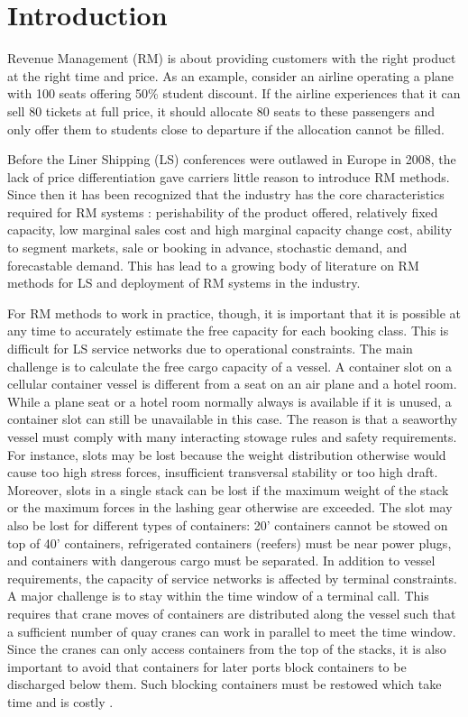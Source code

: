 \section{Introduction}

Revenue Management (RM) is about providing customers with the right product at the right time and price. As an example, consider an airline operating a plane with 100 seats offering 50\% student discount. If the airline experiences that it can sell 80 tickets at full price, it should allocate 80 seats to these passengers and only offer them to students close to departure if the allocation cannot be filled.

Before the Liner Shipping (LS) conferences were outlawed in Europe in 2008, the lack of price differentiation gave carriers little reason to introduce RM methods. Since then it has been recognized that the industry has the core characteristics required for RM systems \cite{Hellerman06}: perishability of the product offered, relatively fixed capacity, low marginal sales cost and high marginal capacity change cost, ability to segment markets, sale or booking in advance, stochastic demand, and forecastable demand. This has lead to a growing body of literature on RM methods for LS and deployment of RM systems in the industry.

For RM methods to work in practice, though, it is important that it is possible at any time to accurately estimate the free capacity for each booking class. This is difficult for LS service networks due to operational constraints. The main challenge is to calculate the free cargo capacity of a vessel. A container slot on a cellular container vessel is different from a seat on an air plane and a hotel room. While a plane seat or a hotel room normally always is available if it is unused, a container slot can still be unavailable in this case. The reason is that a seaworthy vessel must comply with many interacting stowage rules and safety requirements. For instance, slots may be lost because the weight distribution otherwise would cause too high stress forces, insufficient transversal stability or too high draft. Moreover, slots in a single stack can be lost if the maximum weight of the stack or the maximum forces in the lashing gear otherwise are exceeded. The slot may also be lost for different types of containers: 20' containers cannot be stowed on top of 40' containers, refrigerated containers (reefers) must be near power plugs, and containers with dangerous cargo must be separated. In addition to vessel requirements, the capacity of service networks is affected by terminal constraints. A major challenge is to stay within the time window of a terminal call. This requires that crane moves of containers are distributed along the vessel such that a sufficient number of quay cranes can work in parallel to meet the time window. Since the cranes can only access containers from the top of the stacks, it is also important to avoid that containers for later ports block containers to be discharged below them. Such blocking containers must be restowed which take time and is costly \cite{JPAV18}.

